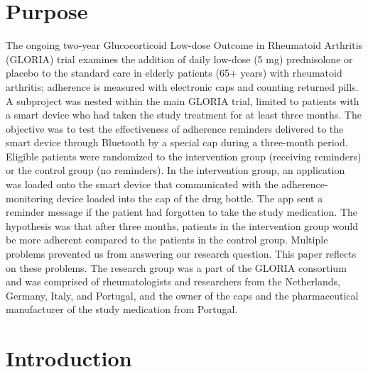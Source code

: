 \documentclass[twocolumn, serif, empirical, authordate]{jote-article}
\begin{document}
\section*{Purpose}

 The ongoing two-year Glucocorticoid Low-dose Outcome in Rheumatoid Arthritis (GLORIA) trial examines the addition of daily low-dose (5 mg)
prednisolone or placebo to the standard care in elderly patients (65+ years) with rheumatoid arthritis; adherence is measured with electronic caps and counting returned pills. A subproject was nested within the main GLORIA trial, limited to patients with a smart device who had taken the study treatment for at least three months. The objective was to test the effectiveness of adherence reminders delivered to the smart device through Bluetooth by a special cap during a three-month period. Eligible patients were randomized to the intervention group (receiving reminders)
or the control group (no reminders). In the intervention group, an application was loaded onto the smart device that communicated with the adherence-monitoring device loaded into the cap of the drug bottle. The app sent a reminder message if the patient had forgotten to take the study medication. The hypothesis was that after three months, patients in the intervention group would be more adherent compared to the patients in the control group. Multiple problems prevented us from answering our research question. This paper reflects on these problems.
The research group was a part of the GLORIA consortium and was comprised of rheumatologists and researchers from the Netherlands, Germany, Italy, and Portugal, and the owner of the caps and the pharmaceutical manufacturer of the study medication from Portugal.


\section*{Introduction}
\end{document}
